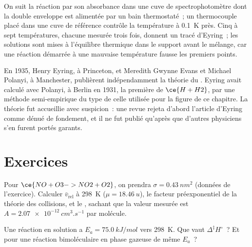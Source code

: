 \begin{inthelab}
On suit la réaction par son absorbance dans une cuve de
spectrophotomètre dont la double enveloppe est alimentée par un bain
thermostaté~; un thermocouple placé dans une cuve de référence contrôle
la température à \qty{0.1}{K} près. Cinq à sept températures, chacune
mesurée trois fois, donnent un tracé d'Eyring~; les solutions sont mises
à l'équilibre thermique dans le support avant le mélange, car une
réaction démarrée à une mauvaise température fausse les premiers points.
\end{inthelab}

\begin{history}
En 1935, Henry Eyring, à Princeton, et Meredith Gwynne Evans et Michael
Polanyi, à Manchester, publièrent indépendamment la théorie du . Eyring avait calculé avec Polanyi, à Berlin en 1931, la première
 de $\ce{H + H2}$, par une méthode
semi-empirique du type de celle utilisée pour la figure de ce chapitre.
La théorie fut accueillie avec suspicion~: une revue rejeta d'abord
l'article d'Eyring comme dénué de fondement, et il ne fut publié qu'après
que d'autres physiciens s'en furent portés garants.
\end{history}

\section{Exercices}

\begin{exercise}[$\star$]\label{exo:b3:rate-theories:1}
Pour $\ce{NO + O3 -> NO2 + O2}$, on prendra $\sigma = \qty{0.43}{nm^2}$
(données de l'exercice). Calculer $\bar v_{\mathrm{rel}}$
à \qty{298}{K} ($\mu = \qty{18.46}{u}$), le facteur préexponentiel de la
théorie des collisions, et le , sachant que la valeur
mesurée est $A = \qty{2.07e-12}{cm^3.s^{-1}}$ par molécule.
\end{exercise}

\begin{exercise}[$\star$]\label{exo:b3:rate-theories:2}
Une réaction en solution a $E_a = \qty{75.0}{kJ/mol}$ vers
\qty{298}{K}. Que vaut $\Delta^{\ddagger}H^\circ$~? Et pour une réaction
bimoléculaire en phase gazeuse de même $E_a$~?
\end{exercise}

